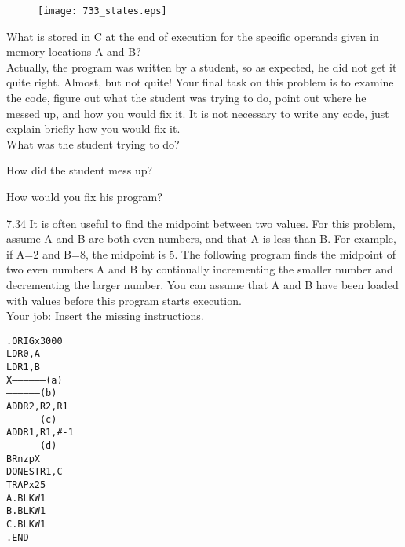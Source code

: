 \documentclass{patt}
\begin{document}
\begin{exercises}
\vspace{-.4in}
\noindent
\begin{figure}[h]
\begin{center}
\texttt{[image: 733\_states.eps]}
\end{center}
\end{figure}

\FloatBarrier

\noindent
What is stored in C at the end of execution for the specific operands given in memory locations A and B? \\

\vspace{.2in}
\noindent
Actually, the program was written by a student, so as expected, he did not get it quite right.  Almost, but not quite!  Your final task on this problem is to examine the code, figure out what the student was trying to do, point out where he messed up, and how you would fix it.  It is not necessary to write any code, just explain briefly how you would fix it.\\

\noindent
What was the student trying to do? \\
\vspace{0.1in}

\noindent
How did the student mess up? \\ 
\vspace{0.1in}

\noindent
How would you fix his program? \\
\vspace{0.1in}


\item[7.34] It is often useful to find the midpoint between two values. For this problem, assume A and B are both even numbers, and that A is less than B.  For example, if A=2 and B=8, the midpoint is 5. The following program finds the midpoint of two even numbers A and B by continually incrementing the smaller number and decrementing the larger number. You can assume that A and B have been loaded with values before this program starts execution. \\ 

\noindent
Your job: Insert the missing instructions. \\

\begin{alltt}
        .ORIG  x3000
        LD     R0,A
        LD     R1,B
X       ------------------ (a)
        ------------------ (b)
        ADD    R2,R2,R1
        ------------------ (c)
        ADD    R1,R1,#-1
        ------------------ (d)
        BRnzp  X
DONE    ST     R1,C
        TRAP   x25
A       .BLKW  1
B       .BLKW  1
C       .BLKW  1
        .END
\end{alltt}


\end{exercises}
\end{document}

